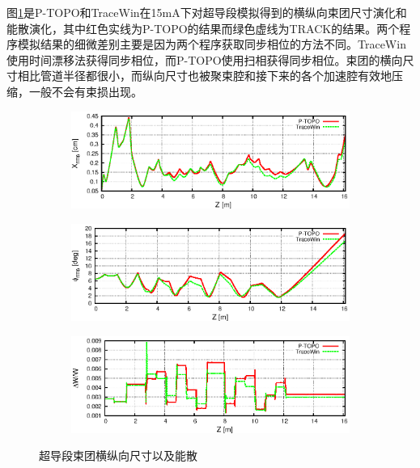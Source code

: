 图\ref{fig:ADS_SC_size}是P-TOPO和TraceWin在15mA下对超导段模拟得到的横纵向束团尺寸演化和能散演化，其中红色实线为P-TOPO的结果而绿色虚线为TRACK的结果。两个程序模拟结果的细微差别主要是因为两个程序获取同步相位的方法不同。TraceWin使用时间漂移法获得同步相位，而P-TOPO使用扫相获得同步相位。束团的横向尺寸相比管道半径都很小，而纵向尺寸也被聚束腔和接下来的各个加速腔有效地压缩，一般不会有束损出现。
\begin{figure}[!htb]
    \centering
    \begin{subfigure}[b]{0.9\textwidth}
        \includegraphics[width=\textwidth]{Img/ADS_SC_size1.eps}
    \end{subfigure}
    \begin{subfigure}[b]{0.9\textwidth}
        \includegraphics[width=\textwidth]{Img/ADS_SC_size2.eps}
    \end{subfigure}
    \begin{subfigure}[b]{0.9\textwidth}
        \includegraphics[width=\textwidth]{Img/ADS_SC_size3.eps}
    \end{subfigure}
    \caption{超导段束团横纵向尺寸以及能散}\label{fig:ADS_SC_size}
\end{figure}

